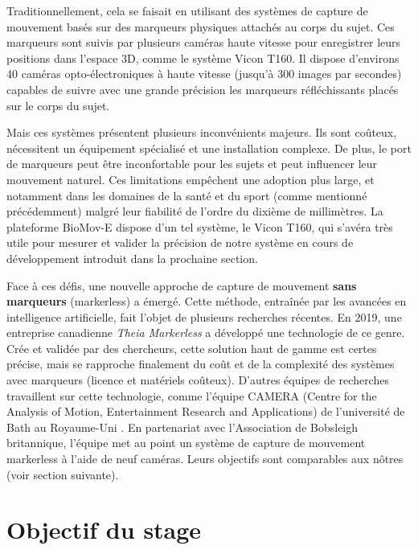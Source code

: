     Traditionnellement, cela se faisait en utilisant des systèmes de capture de mouvement basés sur des marqueurs physiques attachés au corps du sujet. Ces marqueurs sont suivis par plusieurs caméras haute vitesse pour enregistrer leurs positions dans l'espace 3D, comme le système Vicon T160. Il dispose d'environs 40 caméras opto-électroniques à haute vitesse (jusqu'à 300 images par secondes) capables de suivre avec une grande précision les marqueurs réfléchissants placés sur le corps du sujet.

    Mais ces systèmes présentent plusieurs inconvénients majeurs. Ils sont coûteux, nécessitent un équipement spécialisé et une installation complexe. De plus, le port de marqueurs peut être inconfortable pour les sujets et peut influencer leur mouvement naturel. Ces limitations empêchent une adoption plus large, et notamment dans les domaines de la santé et du sport (comme mentionné précédemment) malgré leur fiabilité de l'ordre du dixième de millimètres. La plateforme BioMov-E dispose d'un tel système, le Vicon T160, qui s'avéra très utile pour mesurer et valider la précision de notre système en cours de développement introduit dans la prochaine section.

    Face à ces défis, une nouvelle approche de capture de mouvement \textbf{sans marqueurs} (markerless) a émergé. Cette méthode, entraînée par les avancées en intelligence artificielle, fait l'objet de plusieurs recherches récentes. En 2019, une entreprise canadienne \textit{Theia Markerless} a développé une technologie de ce genre. Crée et validée par des chercheurs, cette solution haut de gamme est certes précise, mais se rapproche finalement du coût et de la complexité des systèmes avec marqueurs (licence et matériels coûteux). D'autres équipes de recherches travaillent sur cette technologie, comme l'équipe CAMERA (Centre for the Analysis of Motion, Entertainment Research and Applications) de l'université de Bath au Royaume-Uni \cite{BATHResearch}. En partenariat avec l'Association de Bobsleigh britannique, l'équipe met au point un système de capture de mouvement markerless à l'aide de neuf caméras. Leurs objectifs sont comparables aux nôtres (voir section suivante).

    
\section{Objectif du stage}

